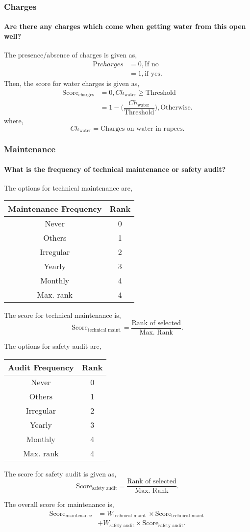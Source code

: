 \documentclass[oneside,twocolumn]{article}
\newcommand{\tsub}[2]{\text{#1}_{\text{#2}}}
\newcommand{\tsubb}[2]{#1_{\text{#2}}}
\newcommand{\dsub}[2]{\dfrac{\text{#1}}{\text{#2}}}
\newenvironment{ttable}
{
\begin{center}
\begin{tabular}{c|c}
\hline
}
{
\\ \hline
\end{tabular}
\end{center}
}
\begin{document}
\subsubsection{Charges}
\paragraph{Are there any charges which come when getting water from this open well?}
The presence/absence of charges is given as,
\begin{align*}
	\text{Pr}{charges} &= 0, \text{If no} \\
	&= 1, \text{if yes}.
\end{align*}
Then, the score for water charges is given as,
\begin{align*}
	\tsub{Score}{charges} &= 0, \tsubb{Ch}{water} \ge \text{Threshold} \\
	&= 1 - \Big( \dfrac{\tsubb{Ch}{water}}{\text{Threshold}} \Big), \text{Otherwise}.
\end{align*}
where,
\[
	\tsubb{Ch}{water} = \text{Charges on water in rupees}.
\]
\subsubsection{Maintenance}
\paragraph{What is the frequency of technical maintenance or safety audit?}
The options for technical maintenance are,
\begin{ttable}
	Maintenance Frequency & Rank \\ \hline
	Never & 0 \\
	Others & 1 \\
	Irregular & 2 \\
	Yearly & 3 \\
	Monthly & 4 \\ \hline
	Max. rank & 4 
\end{ttable}
The score for technical maintenance is,
\[
	\tsub{Score}{technical maint.} = \dsub{Rank of selected}{Max. Rank}.
\]

The options for safety audit are,
\begin{ttable}
	Audit Frequency & Rank \\ \hline
	Never & 0 \\
	Others & 1 \\
	Irregular & 2 \\
	Yearly & 3 \\
	Monthly & 4 \\ \hline
	Max. rank & 4 
\end{ttable}
The score for safety audit is given as,
\[
	\tsub{Score}{safety audit} = \dsub{Rank of selected}{Max. Rank}.
\]

The overall score for maintenance is,
\begin{align*}
	\tsub{Score}{maintenance} &= \tsubb{W}{technical maint.} \times \tsub{Score}{technical maint.} \\
	&+ \tsubb{W}{safety audit} \times \tsub{Score}{safety audit}.
\end{align*}
\end{document}
